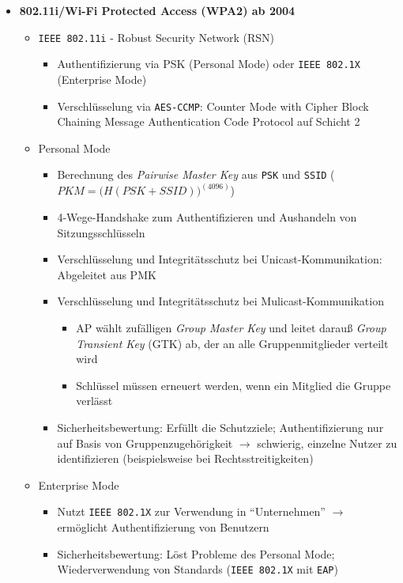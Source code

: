 \begin{itemize}
\begin{itemize}
	\end{itemize}
	\item \textbf{802.11i/Wi-Fi Protected Access (WPA2) ab 2004}
	\begin{itemize}
		\item \texttt{IEEE 802.11i} - Robust Security Network (RSN)
		\begin{itemize}
			\item Authentifizierung via PSK (Personal Mode) oder \texttt{IEEE 802.1X} (Enterprise Mode)
			\item Verschlüsselung via \texttt{AES-CCMP}: Counter Mode with Cipher Block Chaining Message Authentication Code Protocol auf Schicht 2
		\end{itemize}
		\item Personal Mode
		\begin{itemize}
			\item Berechnung des \textit{Pairwise Master Key} aus \texttt{PSK} und \texttt{SSID} (\(PKM = \big(H(PSK+SSID)\big)^(4096)\))
			\item 4-Wege-Handshake zum Authentifizieren und Aushandeln von Sitzungsschlüsseln
			\item Verschlüsselung und Integritätsschutz bei Unicast-Kommunikation: Abgeleitet aus PMK
			\item Verschlüsselung und Integritätsschutz bei Mulicast-Kommunikation
			\begin{itemize}
				\item AP wählt zufälligen \textit{Group Master Key} und leitet darauß \textit{Group Transient Key} (GTK) ab, der an alle Gruppenmitglieder verteilt wird
				\item Schlüssel müssen erneuert werden, wenn ein Mitglied die Gruppe verlässt
			\end{itemize}
			\item Sicherheitsbewertung: Erfüllt die Schutzziele; Authentifizierung nur auf Basis von Gruppenzugehörigkeit \(\rightarrow\) schwierig, einzelne Nutzer zu identifizieren (beispielsweise bei Rechtsstreitigkeiten)
		\end{itemize}
		\item Enterprise Mode
		\begin{itemize}
			\item Nutzt \texttt{IEEE 802.1X} zur Verwendung in "`Unternehmen"' \(\rightarrow\) ermöglicht Authentifizierung von Benutzern
			\item Sicherheitsbewertung: Löst Probleme des Personal Mode; Wiederverwendung von Standards (\texttt{IEEE 802.1X} mit \texttt{EAP})
		\end{itemize}
	\end{itemize}
\end{itemize}


